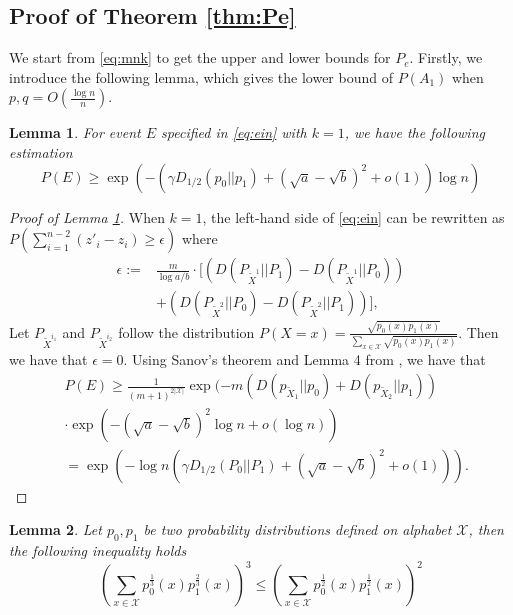 \documentclass[conference,letterpaper]{IEEEtran}
\newtheorem{lemma}{Lemma}
\begin{document}
\subsection{Proof of Theorem \ref{thm:Pe}}
We start from \eqref{eq:mnk} to get the upper and lower bounds for $P_e$.
Firstly, we introduce the following lemma, which gives the lower bound
of $P(A_1)$ when $p,q=O(\frac{\log n}{n})$.
\begin{lemma}\label{lem:single_lower}
For event $E$ specified in \eqref{eq:ein} with $k=1$,
we have the following estimation
\begin{equation}
P(E) \geq \exp(-(\gamma D_{1/2}(p_0||p_1) + (\sqrt{a}-\sqrt{b})^2 + o(1))\log n )
\end{equation}
\end{lemma}
\begin{proof}[Proof of Lemma \ref{lem:single_lower}] 
	When $k=1$, the left-hand side of \eqref{eq:ein} can be rewritten as $P(\sum_{i=1}^{n-2} (z'_i - z_i) \geq \epsilon)$
	where
	\begin{align*}
	\epsilon := &\frac{m}{\log a/b}\cdot [(D(P_{\widetilde{X}^{1}} || P_1) - D(P_{\widetilde{X}^{1}} || P_0)) \\
	&+(D(P_{\widetilde{X}^{2}} || P_0) - D(P_{\widetilde{X}^{2}} || P_1))],
	\end{align*}
	Let $P_{\widetilde{X}^{i_1}}$ and $P_{\widetilde{X}^{i_2}}$ follow the distribution
	$P(X=x)=\frac{\sqrt{p_0(x)p_1(x)}}{ \sum_{x\in \mathcal{X}} \sqrt{p_0(x) p_1(x)}} $.
	Then we have that $\epsilon =0$. Using Sanov's theorem and Lemma 4 from \cite{abbe2015exact}, we have that
	\begin{align*}
	 &P(E)
	\geq\frac{1}{(m+1)^{2|\mathcal{X}|}} \exp(-m(D(p_{\widetilde{X}_1} || p_0) + D(p_{\widetilde{X}_2} || p_1)) \\
	&\cdot\exp(- (\sqrt{a} - \sqrt{b})^2\log n+o(\log n) ) \\
	& = \exp(-\log n (\gamma D_{1/2}(P_0||P_1) + (\sqrt{a} - \sqrt{b})^2+ o(1))).
	\end{align*}
\end{proof}
\begin{lemma}\label{lem:p0p1}
	Let $p_0,p_1$ be two probability distributions defined on alphabet $\mathcal{X}$,
	then the following inequality holds
	\begin{equation}\label{eq:32}
		(\sum_{x\in \mathcal{X}} p^{\frac{1}{3}}_0(x) p^{\frac{2}{3}}_1(x))^3
		\leq (\sum_{x\in \mathcal{X}} p^{\frac{1}{2}}_0(x) p^{\frac{1}{2}}_1(x))^2
	\end{equation}
\end{lemma}
\end{document}
